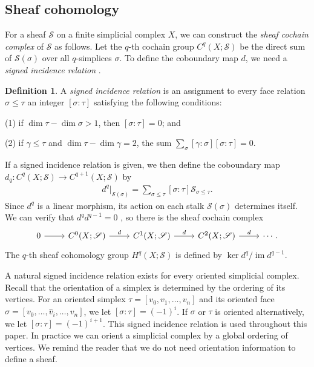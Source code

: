 \documentclass[11pt]{article}
\DeclareMathOperator{\im}{im}
\theoremstyle{definition}
\newtheorem{definition}{Definition}[section]
\theoremstyle{definition}
\begin{document}
\subsection{Sheaf cohomology}

For a sheaf $\mathscr{S}$ on a finite simplicial complex $X$, 
we can construct the \emph{sheaf cochain complex} of $\mathscr{S}$ as follows.
Let the $q$-th cochain group $C^q(X; \mathscr{S})$ be the direct sum of
$\mathscr{S}(\sigma)$ over all $q$-simplices $\sigma$. 
To define the coboundary map $d$, we need a \emph{signed incidence relation} \cite{curry2014sheaves}.

\begin{definition}
    A \emph{signed incidence relation} is an assignment to every face relation $\sigma \leqslant \tau$ an integer 
    $[\sigma: \tau]$ satisfying the following conditions:

    (1) if $\dim \tau - \dim \sigma > 1$, then $[\sigma:\tau] = 0$; and

    (2) if $\gamma \leqslant \tau$ and $\dim \tau - \dim \gamma=2$, the sum $\sum_{\sigma} [\gamma: \sigma][\sigma: \tau] = 0$.
\end{definition}

If a signed incidence relation is given,  
we then define the coboundary map $d_{q}: C^q(X; \mathscr{S}) \to C^{q+1}(X; \mathscr{S})$ by 
\begin{align*}
    d^q \vert_{\mathscr{S}(\sigma)} = \sum_{\sigma \leqslant \tau} [\sigma: \tau] \mathscr{S}_{\sigma \leqslant \tau}.
\end{align*} 
Since $d^q$ is a linear morphism, its action on each stalk $\mathscr{S}({\sigma})$ determines itself.
We can verify that $d^qd^{q-1}=0$ \cite[Lemma 6.2.2]{curry2014sheaves}, so there is the sheaf cochain complex
\[
    \begin{tikzcd}
        \centering
    0 \arrow[r] & 
    C^0(X; \mathscr{S}) \arrow[r, "d"] & 
    C^1(X; \mathscr{S}) \arrow[r, "d"] & 
    C^2(X; \mathscr{S}) \arrow[r, "d"] & 
    \cdots.
    \end{tikzcd} 
\]
The $q$-th sheaf cohomology group $H^q(X; \mathscr{S})$ is defined by $\ker d^q/\im d^{q-1}$. 

A natural signed incidence relation exists for every oriented simplicial complex. 
Recall that the orientation of a simplex is determined by the ordering of its vertices. 
For an oriented simplex $\tau=[v_0, v_1, \dots, v_n]$ and its oriented face 
$\sigma =[v_0, \dots, \hat{v}_{i}, \dots, v_n]$, we let $[\sigma:\tau] = (-1)^i$.
If $\sigma$ or $\tau$ is oriented alternatively,  we let $[\sigma:\tau] = (-1)^{i+1}$.
This signed incidence relation is used throughout this paper. 
In practice we can orient a simplicial complex by a global ordering of vertices.
We remind the reader that we do not need orientation information to define a sheaf. 
\end{document}
